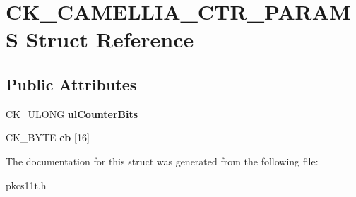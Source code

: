 \hypertarget{struct_c_k___c_a_m_e_l_l_i_a___c_t_r___p_a_r_a_m_s}{}\section{C\+K\+\_\+\+C\+A\+M\+E\+L\+L\+I\+A\+\_\+\+C\+T\+R\+\_\+\+P\+A\+R\+A\+MS Struct Reference}
\label{struct_c_k___c_a_m_e_l_l_i_a___c_t_r___p_a_r_a_m_s}
\subsection*{Public Attributes}
\begin{DoxyCompactItemize}
\item 
\mbox{\label{struct_c_k___c_a_m_e_l_l_i_a___c_t_r___p_a_r_a_m_s_acd40627e7750b86612be7f02fdfa5515}} 
C\+K\+\_\+\+U\+L\+O\+NG {\bfseries ul\+Counter\+Bits}
\item 
\mbox{\label{struct_c_k___c_a_m_e_l_l_i_a___c_t_r___p_a_r_a_m_s_a42e929b9a6ba82f36802ce25fbb0063e}} 
C\+K\+\_\+\+B\+Y\+TE {\bfseries cb} \mbox{[}16\mbox{]}
\end{DoxyCompactItemize}


The documentation for this struct was generated from the following file\+:\begin{DoxyCompactItemize}
\item 
pkcs11t.\+h\end{DoxyCompactItemize}
